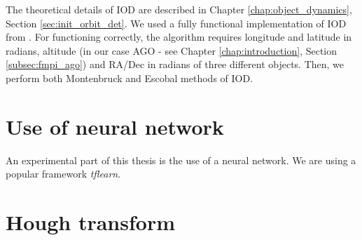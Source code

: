 	The theoretical details of IOD are described in Chapter \ref{chap:object_dynamics}, Section \ref{sec:init_orbit_det}. We used a fully functional implementation of IOD from \citep{Silha2012id}. For functioning correctly, the algorithm requires longitude and latitude in radians, altitude (in our case AGO - see Chapter \ref{chap:introduction}, Section \ref{subsec:fmpi_ago}) and RA/Dec in radians of three different objects. Then, we perform both Montenbruck and Escobal methods of IOD.

\section{Use of neural network}\label{sec:neural}

	An experimental part of this thesis is the use of a neural network. We are using a popular framework \emph{tflearn}.

\section{Hough transform}\label{sec:hough}